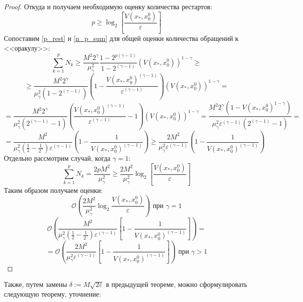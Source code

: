 \begin{proof}
       Откуда и получаем необходимую оценку количества рестартов:
       \begin{equation} \label{p_rest}
            p \geq \log_2{\left[\frac{V(x_*, x_0^0)}{\varepsilon}\right]}
       \end{equation}
       Сопоставим \eqref{p_rest} и \eqref{n_p_sum} для общей оценки количества обращений к <<оракулу>>:
       $$
           \sum_{k=1}^{p} N_k \geq \frac{M^2 2^{\gamma}}{\mu_{\gamma}^2} \frac{1 - 2^{p(\gamma-1)}}{1 - 2^{(\gamma-1)}} (V(x_*, x_0^0))^{1 - \gamma} \geq 
       $$
       $$
           \geq \frac{M^2 2^{\gamma}}{\mu_{\gamma}^2 (1 - 2^{(\gamma-1)})} \left(1 - \frac{V(x_*, x_0^0)^{(\gamma-1)}}{\varepsilon^{(\gamma-1)}}\right) (V(x_*, x_0^0))^{1 - \gamma} =
       $$
       $$
           = \frac{M^2 2^{\gamma}}{\mu_{\gamma}^2 (2^{(\gamma-1)} - 1)} \left(\frac{V(x_*, x_0^0)^{(\gamma-1)}}{\varepsilon^{(\gamma-1)}} - 1\right) (V(x_*, x_0^0))^{1 - \gamma} = \frac{M^2 2^{\gamma}(1 - V(x_*, x_0^0)^{1 - \gamma}) }{\mu_{\gamma}^2 \varepsilon^{(\gamma-1)} (2^{(\gamma-1)} - 1)} = 
       $$
       $$
           = \frac{M^2}{\mu_{\gamma}^2 (\frac{1}{2} - \frac{1}{2^\gamma}) \varepsilon^{(\gamma-1)} } \left(1 - \frac{1} {V(x_*, x_0^0)^{(\gamma - 1)}}\right) \geq \frac{2 M^2}{\mu_{\gamma}^2 \varepsilon^{(\gamma-1)} } \left(1 - \frac{1} {V(x_*, x_0^0)^{(\gamma - 1)}}\right) 
       $$
       Отдельно рассмотрим случай, когда $\gamma = 1$:
       $$
           \sum_{k=1}^{p} N_k = \frac{2 p M^2}{\mu_{\gamma}^2} \geq \frac{2 M^2}{\mu_{\gamma}^2} \log_2{\left[\frac{V(x_*, x_0^0)}{\varepsilon}\right]}
       $$
       Таким образом получаем оценки:
       $$
           \mathcal{O} \left(\frac{2 M^2}{\mu_{\gamma}^2} \log_2{\frac{V(x_*, x_0^0)}{\varepsilon}}\right) \text{ при } \gamma = 1
       $$
       $$
           \mathcal{O} \left(\frac{M^2}{\mu_{\gamma}^2 \left(\frac{1}{2} - \frac{1}{2^\gamma}\right) \varepsilon^{(\gamma-1)} } \left[1 - \frac{1} {V(x_*, x_0^0)^{(\gamma - 1)}}\right]\right) =
       $$
       $$
           = \mathcal{O} \left(\frac{2 M^2}{\mu_{\gamma}^2 \varepsilon^{(\gamma-1)} } \left[1 - \frac{1} {V(x_*, x_0^0)^{(\gamma - 1)}}\right]\right) \text{ при } \gamma > 1
       $$
    \end{proof}
    Также, путем замены $\delta := M \sqrt{2 \varepsilon}$ в предыдущей теореме, можно сформулировать следующую теорему, уточнение:
